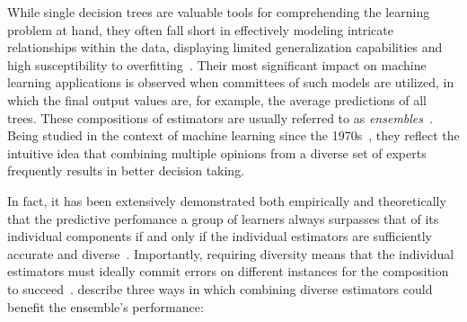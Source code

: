 While single decision trees are valuable tools for comprehending the learning problem at hand, they often fall short in effectively modeling intricate relationships within the data, displaying limited generalization capabilities and high susceptibility to overfitting~\cite{breiman2001random,chen2016xgboost}.  %
%
Their most significant impact on machine learning applications is observed when committees of such models are utilized, in which the final output values
are, for example, the average predictions of all trees.
%
These compositions of estimators are usually referred to as \emph{ensembles}~\cite{dietterich2000ensemble,breiman2001random,polikar2006ensemble}.
Being studied in the context of machine learning since the 1970s~\cite{dietterich2000ensemble,polikar2006ensemble}, they reflect the intuitive idea that combining multiple opinions from a diverse set of experts frequently results in better decision taking. %


In fact, it has been extensively demonstrated both empirically and theoretically that the predictive perfomance a group of learners always surpasses that of its individual components if and only if the individual estimators are sufficiently accurate and diverse~\cite{dietterich2000ensemble,breiman2001random,polikar2006ensemble,zhou2019deep}. %
Importantly, requiring diversity means that the individual estimators must ideally commit errors on different instances for the composition to succeed~\cite{polikar2006ensemble}.
%
 describe three ways in which combining diverse estimators could benefit the ensemble's performance:

